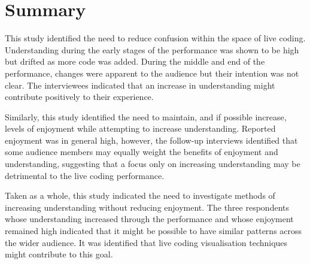 
\section{Summary}

This study identified the need to reduce confusion within the space of live coding. Understanding during the early stages of the performance was shown to be high but drifted as more code was added. During the middle and end of the performance, changes were apparent to the audience but their intention was not clear. The interviewees indicated that an increase in understanding might contribute positively to their experience.

Similarly, this study identified the need to maintain, and if possible increase, levels of enjoyment while attempting to increase understanding. Reported enjoyment was in general high, however, the follow-up interviews identified that some audience members may equally weight the benefits of enjoyment and understanding, suggesting that a focus only on increasing understanding may be detrimental to the live coding performance.

Taken as a whole, this study indicated the need to investigate methods of increasing understanding without reducing enjoyment. The three respondents whose understanding increased through the performance and whose enjoyment remained high indicated that it might be possible to have similar patterns across the wider audience. It was identified that live coding visualisation techniques might contribute to this goal.



